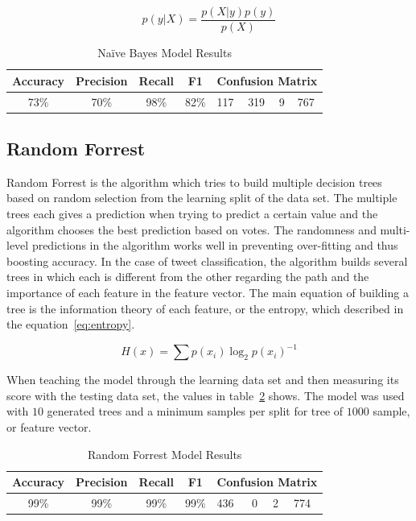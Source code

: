 \documentclass[conference]{IEEEtran}
\begin{document}
\begin{equation}
p(y|X) = \frac{p(X|y)p(y)}{p(X)}
    \label{eq:nb}
\end{equation}

\begin{table}
\centering
\caption{Naïve Bayes Model Results }
\label{table:nb-res}
\begin{tabular}{|c|c|c|c|l|l|l|l|} 
\hline
\rowcolor[rgb]{0.753,0.753,0.753} Accuracy & Precision & Recall & F1   & \multicolumn{4}{l|}{Confusion Matrix}  \\ 
\hline
\rowcolor[rgb]{0.753,0.753,0.753} 73\%     & 70\%      & 98\%   & 82\% & 117 & 319 & 9 & 767                    \\
\hline
\end{tabular}
\end{table}

\subsection{Random Forrest}
Random Forrest is the algorithm which tries to build multiple decision trees based on random selection from the learning split of the data set. The multiple trees each gives a prediction when trying to predict a certain value and the algorithm chooses the best prediction based on votes. The randomness and multi-level predictions in the algorithm works well in preventing over-fitting and thus boosting accuracy. In the case of tweet classification, the algorithm builds several trees in which each is different from the other regarding the path and the importance of each feature in the feature vector. The main equation of building a tree is the information theory of each feature, or the entropy, which described in the equation~\ref{eq:entropy}.

\begin{equation}
    H(x) = \sum p(x_i) \log_2 p(x_i)^{-1}
    \label{eq:entropy}
\end{equation}

When teaching the model through the learning data set and then measuring its score with the testing data set, the values in table~\ref{table:rf-res} shows. The model was used with $10$ generated trees and a minimum samples per split for tree of $1000$ sample, or feature vector.

\begin{table}
\centering
\caption{Random Forrest Model Results }
\label{table:rf-res}
\begin{tabular}{|c|c|c|c|l|l|l|l|} 
\hline
\rowcolor[rgb]{0.753,0.753,0.753} Accuracy & Precision & Recall & F1   & \multicolumn{4}{l|}{Confusion Matrix}  \\ 
\hline
\rowcolor[rgb]{0.753,0.753,0.753} 99\%     & 99\%      & 99\%   & 99\% & 436 & 0 & 2 & 774                      \\
\hline
\end{tabular}
\end{table}
\end{document}

